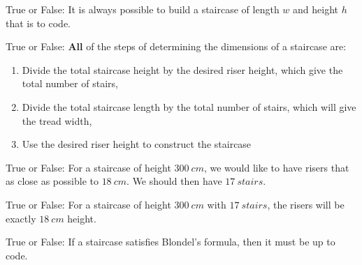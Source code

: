 \documentclass[noauthor,nooutcomes]{ximera}
\author{Claire Merriman}
\begin{document}
\maketitle



\begin{exercise}
  True or False: It is always possible to build a staircase of length $w$ and height $h$ that is to code. 
\end{exercise}


\begin{exercise}
   True or False: \textbf{All} of the steps of determining the dimensions of a staircase are:
   
\begin{enumerate}
 \item Divide the total staircase height by the desired riser height, which give the total number of stairs,
 \item Divide the total staircase length by the total number of stairs, which will give the tread width,
 \item Use the desired riser height to construct the staircase
\end{enumerate}
\end{exercise}


\begin{exercise} True or False: 
 For a staircase of height $300\ cm$, we would like to have risers that as close as possible to $18\ cm$. We should then have $17\ stairs$.
\end{exercise}

\begin{exercise} True or False: 
 For a staircase of height $300\ cm$ with $17\ stairs$, the risers will be exactly $18\ cm$ height.
\end{exercise}

\begin{exercise} True or False: 
  If a staircase satisfies Blondel's formula, then it must be up to code.
\end{exercise}

\end{document}
